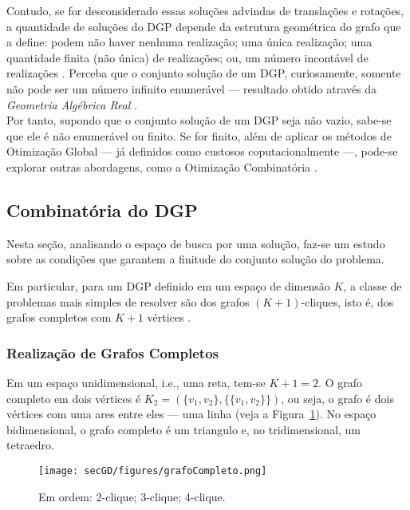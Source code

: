 Contudo, se for desconsiderado essas soluções advindas de translações e rotações, a quantidade de soluções do DGP depende da estrutura geométrica do grafo que a define: podem não haver nenhuma realização; uma única realização; uma quantidade finita (não única) de realizações; ou, um número incontável de realizações \cite{libertiEDG}. Perceba que o conjunto solução de um DGP, curiosamente, somente não pode ser um número infinito enumerável --- resultado obtido através da \textit{Geometria Algébrica Real} \cite{benedettireal}.\\
 
Por tanto, supondo que o conjunto solução de um DGP seja não vazio, sabe-se que ele é não enumerável ou finito. Se for finito, além de aplicar os métodos de Otimização Global --- já definidos como custosos coputacionalmente ---, pode-se explorar outras abordagens, como a Otimização Combinatória \cite{carlileBook31Coloquio}. 

\subsection{Combinatória do DGP}

Nesta seção, analisando o espaço de busca por uma solução, faz-se um estudo sobre as condições que garantem a finitude do conjunto solução do problema. 

Em particular, para um DGP definido em um espaço de dimensão $K$, a classe de problemas mais simples de resolver são dos grafos $(K+1)$-cliques, isto é, dos grafos completos com $K+1$ vértices \cite{libertiEDG}.

\subsubsection{Realização de Grafos Completos}

Em um espaço unidimensional, i.e., uma reta, tem-se $K+1 = 2$. O grafo completo em dois vértices é $K_2 = (\{v_1,v_2\}, \{\{v_1,v_2\}\})$, ou seja, o grafo é dois vértices com uma ares entre eles --- uma linha (veja a Figura~\ref{fig:grafoCompleto}). No espaço bidimensional, o grafo completo é um triangulo e, no tridimensional, um tetraedro.

\begin{figure}[H]
	\begin{center}
		\texttt{[image: secGD/figures/grafoCompleto.png]}
	\end{center}
	\caption{Em ordem: 2-clique; 3-clique; 4-clique.}
	\label{fig:grafoCompleto}
\end{figure}

